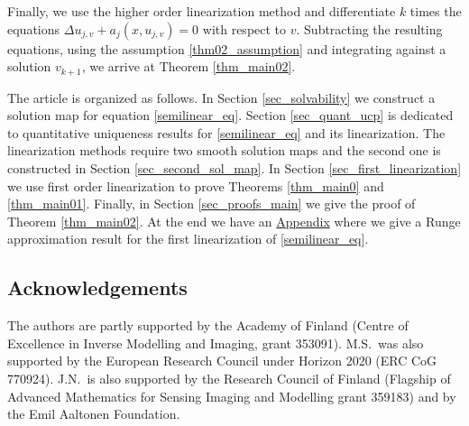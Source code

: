 \documentclass[11pt,a4paper]{amsart}
\theoremstyle{definition}
\numberwithin{equation}{section}
\begin{document}
Finally, we use the higher order linearization method and differentiate $k$ times the equations $\Delta u_{j,v} + a_j(x, u_{j,v}) = 0$ with respect to $v$. Subtracting the resulting equations, using the assumption \eqref{thm02_assumption} and integrating against a solution $v_{k+1}$, we arrive at Theorem \ref{thm_main02}.

The article is organized as follows. In Section \ref{sec_solvability} we construct a solution map for equation \eqref{semilinear_eq}. Section \ref{sec_quant_ucp} is dedicated to quantitative uniqueness results for \eqref{semilinear_eq} and its linearization. The linearization methods require two smooth solution maps and the second one is constructed in Section \ref{sec_second_sol_map}. In Section \ref{sec_first_linearization} we use first order linearization to prove Theorems \ref{thm_main0} and \ref{thm_main01}. Finally, in Section \ref{sec_proofs_main} we give the proof of Theorem \ref{thm_main02}. At the end we have an \hyperref[sec_runge]{Appendix} where we give a Runge approximation result for the first linearization of \eqref{semilinear_eq}.

\subsection*{Acknowledgements}

The authors are partly supported by the Academy of Finland (Centre of Excellence in
Inverse Modelling and Imaging, grant 353091). M.S.\ was also supported by the European Research Council under Horizon 2020 (ERC CoG 770924). J.N.\ is also supported by the Research Council of Finland (Flagship of Advanced Mathematics for Sensing Imaging and Modelling grant 359183) and by the Emil Aaltonen Foundation.
\end{document}
